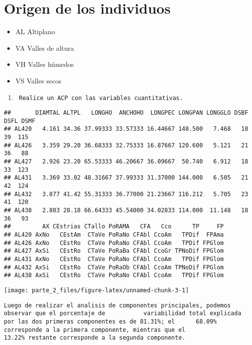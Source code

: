\documentclass[
]{article}
\providecommand{\tightlist}{%
  \setlength{\itemsep}{0pt}\setlength{\parskip}{0pt}}
\begin{document}
\hypertarget{origen-de-los-individuos}{%
\section{Origen de los individuos}\label{origen-de-los-individuos}}

\begin{itemize}
\tightlist
\item
  AL Altiplano
\item
  VA Valles de altura
\item
  VH Valles húmedos
\item
  VS Valles secos
\end{itemize}

\begin{enumerate}
\def\labelenumi{\Alph{enumi})}
\item
\begin{verbatim}
 Realice un ACP con las variables cuantitativas.
\end{verbatim}
\end{enumerate}

\begin{verbatim}
##       DIAMTAL ALTPL   LONGHO  ANCHOHO  LONGPEC LONGPAN LONGGLO DSBF DSFL DSMF
## AL420   4.161 34.36 37.99333 33.57333 16.44667 148.500   7.468   18   39  115
## AL426   3.359 29.20 36.68333 32.75333 16.87667 120.600   5.121   21   36   88
## AL427   2.926 23.20 65.53333 46.20667 36.09667  50.740   6.912   18   33  123
## AL431   3.369 33.02 48.31667 37.99333 31.37000 144.000   6.505   21   42  124
## AL432   3.877 41.42 55.31333 36.77000 21.23667 116.212   5.705   23   41  120
## AL438   2.803 28.18 66.64333 45.54000 34.02833 114.000  11.148   18   36   93
##         AX CEstrias CTallo PoRAMA   CFA   Cco      TP     FP
## AL420 AxNo   CEstAm  CTaVe PoRaNo CFAbl CcoAm   TPDif  FPAma
## AL426 AxNo   CEstRo  CTaVe PoRaNo CFAbl CcoAm   TPDif FPGlom
## AL427 AxSi   CEstRo  CTaVe PoRaBa CFAbl CcoGr TPNoDif FPGlom
## AL431 AxNo   CEstRo  CTaVe PoRaNo CFAbl CcoAm   TPDif FPGlom
## AL432 AxSi   CEstRo  CTaVe PoRaOb CFAbl CcoAm TPNoDif FPGlom
## AL438 AxSi   CEstRo  CTaVe PoRaNo CFAbl CcoAm   TPDif FPGlom
\end{verbatim}

\begin{center}\texttt{[image: parte\_2\_files/figure-latex/unnamed-chunk-3-1]} \end{center}

\begin{verbatim}
Luego de realizar el analisis de componentes principales, podemos observar que el porcentaje de           variabilidad total explicada por las dos primeras componentes es de 81.31%; el      68.09% corresponde a la primera componente, mientras que el 
13.22% restante corresponde a la segunda componente.
\end{verbatim}
\end{document}

